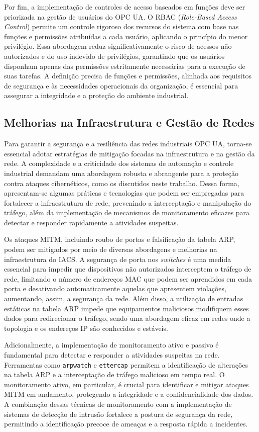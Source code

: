        Por fim, a implementação de controles de acesso baseados em funções deve ser priorizada na gestão de usuários do OPC UA. O RBAC (\textit{Role-Based Access Control}) permite um controle rigoroso dos recursos do sistema com base nas funções e permissões atribuídas a cada usuário, aplicando o princípio do menor privilégio. Essa abordagem reduz significativamente o risco de acessos não autorizados e do uso indevido de privilégios, garantindo que os usuários disponham apenas das permissões estritamente necessárias para a execução de suas tarefas. A definição precisa de funções e permissões, alinhada aos requisitos de segurança e às necessidades operacionais da organização, é essencial para assegurar a integridade e a proteção do ambiente industrial.

    \subsection{Melhorias na Infraestrutura e Gestão de Redes}

        Para garantir a segurança e a resiliência das redes industriais OPC UA, torna-se essencial adotar estratégias de mitigação focadas na infraestrutura e na gestão da rede. A complexidade e a criticidade dos sistemas de automação e controle industrial demandam uma abordagem robusta e abrangente para a proteção contra ataques cibernéticos, como os discutidos neste trabalho. Dessa forma, apresentam-se algumas práticas e tecnologias que podem ser empregadas para fortalecer a infraestrutura de rede, prevenindo a interceptação e manipulação do tráfego, além da implementação de mecanismos de monitoramento eficazes para detectar e responder rapidamente a atividades suspeitas.

        Os ataques MITM, incluindo roubo de portas e falsificação da tabela ARP, podem ser mitigados por meio de diversas abordagens e melhorias na infraestrutura do IACS. A segurança de porta nos \textit{switches} é uma medida essencial para impedir que dispositivos não autorizados interceptem o tráfego de rede, limitando o número de endereços MAC que podem ser aprendidos em cada porta e desativando automaticamente aquelas que apresentem violações, aumentando, assim, a segurança da rede. Além disso, a utilização de entradas estáticas na tabela ARP impede que equipamentos maliciosos modifiquem esses dados para redirecionar o tráfego, sendo uma abordagem eficaz em redes onde a topologia e os endereços IP são conhecidos e estáveis.
        
        Adicionalmente, a implementação de monitoramento ativo e passivo é fundamental para detectar e responder a atividades suspeitas na rede. Ferramentas como \texttt{arpwatch} e \texttt{ettercap} permitem a identificação de alterações na tabela ARP e a interceptação de tráfego malicioso em tempo real. O monitoramento ativo, em particular, é crucial para identificar e mitigar ataques MITM em andamento, protegendo a integridade e a confidencialidade dos dados. A combinação dessas técnicas de monitoramento com a implementação de sistemas de detecção de intrusão fortalece a postura de segurança da rede, permitindo a identificação precoce de ameaças e a resposta rápida a incidentes.
        
